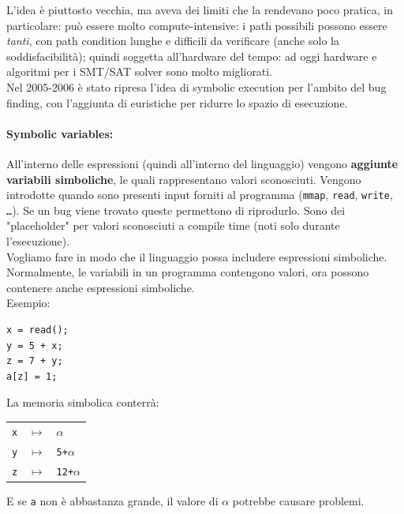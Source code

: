 L'idea è piuttosto vecchia, ma aveva dei limiti che la rendevano poco pratica, in particolare: può essere molto compute-intensive: i path possibili possono essere \textit{tanti}, con path condition lunghe e difficili da verificare (anche solo la soddisfacibilità); quindi soggetta all'hardware del tempo: ad oggi hardware e algoritmi per i SMT/SAT solver sono molto migliorati.\\
Nel 2005-2006 è stato ripresa l'idea di symbolic execution per l'ambito del bug finding, con l'aggiunta di euristiche per ridurre lo spazio di esecuzione.\\

\newpage

\paragraph{Symbolic variables:} All'interno delle espressioni (quindi all'interno del linguaggio) vengono \textbf{aggiunte variabili simboliche}, le quali rappresentano valori sconosciuti. Vengono introdotte quando sono presenti input forniti al programma (\texttt{mmap}, \texttt{read}, \texttt{write}, \texttt{\dots}). Se un bug viene trovato queste permettono di riprodurlo. Sono dei "placeholder" per valori sconosciuti a compile time (noti solo durante l'esecuzione).\\

Vogliamo fare in modo che il linguaggio possa includere espressioni simboliche. Normalmente, le variabili in un programma contengono valori, ora possono contenere anche espressioni simboliche. \\

Esempio: 
\begin{center}
	\begin{minipage}{0.3\linewidth}
		\begin{verbatim}
x = read();
y = 5 + x;
z = 7 + y;
a[z] = 1;
		\end{verbatim}
	\end{minipage}
	\hfill
	\begin{minipage}{0.6\linewidth}
		La memoria simbolica conterrà: 
		\begin{center}
			\begin{tabular}{l l l}
				\texttt{x} & $\mapsto$ & $\alpha$ \\
				\texttt{y} & $\mapsto$ & \texttt{5+$\alpha$} \\
				\texttt{z} & $\mapsto$ & \texttt{12+$\alpha$}
			\end{tabular}
		\end{center}
		E se \texttt{a} non è abbastanza grande, il valore di $\alpha$ potrebbe causare problemi.
	\end{minipage}
\end{center}

